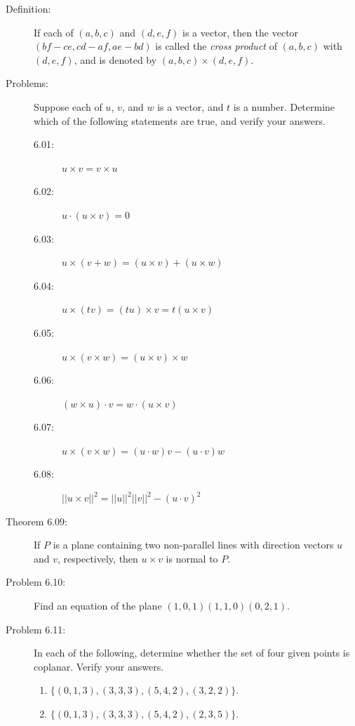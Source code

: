 \documentclass{article}
\begin{document}
\begin{description}

  \item[Definition:] If each of $(a,b,c)$ and $(d,e,f)$ is a vector, then the vector $(bf-ce, cd-af, ae-bd)$ is called the \emph{cross product} of $(a,b,c)$ with $(d,e,f)$, and is denoted by $(a,b,c) \times (d,e,f)$.

  \item[Problems:] Suppose each of $u$, $v$, and $w$ is a vector, and $t$ is a number. Determine which of the following statements are true, and verify your answers.
    \begin{description}
      \item[6.01:] $u \times v = v \times u$
      \item[6.02:] $u \cdot (u \times v) = 0$
      \item[6.03:] $u \times (v+w) = (u \times v) + (u \times w)$
      \item[6.04:] $u \times (t v) = (t u) \times v = t (u \times v)$
      \item[6.05:] $u \times (v \times w) = (u \times v) \times w$
      \item[6.06:] $(w \times u) \cdot v = w \cdot (u \times v)$
      \item[6.07:] $u \times (v \times w) = (u \cdot w)v - (u \cdot v)w$
      \item[6.08:] $\vert \vert u \times v \vert \vert ^{2} = \vert \vert u \vert \vert ^{2} \vert \vert v \vert \vert ^{2} - (u \cdot v)^{2}$
    \end{description}

  \item[Theorem 6.09:] If $P$ is a plane containing two non-parallel lines with direction vectors $u$ and $v$, respectively, then $u \times v$ is normal to $P$.

  \item[Problem 6.10:] Find an equation of the plane $(1, 0, 1) (1, 1, 0) (0, 2, 1)$.

  \item[Problem 6.11:] In each of the following, determine whether the set of four given points is coplanar. Verify your answers.
    \begin{enumerate}[\hspace{1cm}(a)]
      \item $\{ (0, 1, 3), (3, 3, 3), (5, 4, 2), (3, 2, 2) \}$.
      \item $\{ (0, 1, 3), (3, 3, 3), (5, 4, 2), (2, 3, 5) \}$.
    \end{enumerate}


\end{description}
\end{document}
